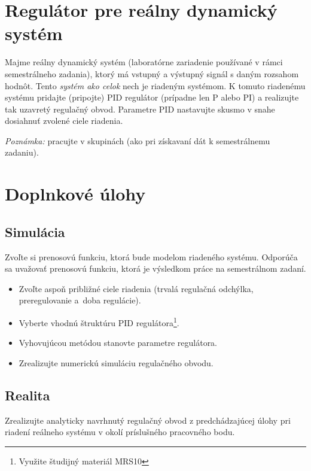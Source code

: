 \documentclass[a4paper, 10pt, ]{article}
\begin{document}
\section{Regulátor pre reálny dynamický systém}

Majme reálny dynamický systém (laboratórne zariadenie používané v rámci semestrálneho zadania), ktorý má vstupný a výstupný signál s daným rozsahom hodnôt. Tento \emph{systém ako celok} nech je riadeným systémom. K tomuto riadenému systému pridajte (pripojte) PID regulátor (prípadne len P alebo PI) a realizujte tak uzavretý regulačný obvod. Parametre PID nastavujte skusmo v snahe dosiahnuť zvolené ciele riadenia.

\bigskip

\noindent
\emph{Poznámka:} pracujte v skupinách (ako pri získavaní dát k semestrálnemu zadaniu).






\section{Doplnkové úlohy}

\subsection{Simulácia}

Zvoľte si prenosovú funkciu, ktorá bude modelom riadeného systému. Odporúča sa uvažovať prenosovú funkciu, ktorá je výsledkom práce na semestrálnom zadaní. 

\begin{itemize}[leftmargin=0pt, labelsep=3mm, itemsep=0pt]
    \item Zvoľte aspoň približné ciele riadenia (trvalá regulačná odchýlka, preregulovanie a~doba regulácie).
    \item Vyberte vhodnú štruktúru PID regulátora\footnote{Využite študijný materiál MRS10}.
    \item Vyhovujúcou metódou stanovte parametre regulátora\footnotemark[\value{footnote}].
    \item Zrealizujte numerickú simuláciu regulačného obvodu.
\end{itemize}


\subsection{Realita}

Zrealizujte analyticky navrhnutý regulačný obvod z predchádzajúcej úlohy pri riadení reálneho systému v okolí príslušného pracovného bodu.
\end{document}
